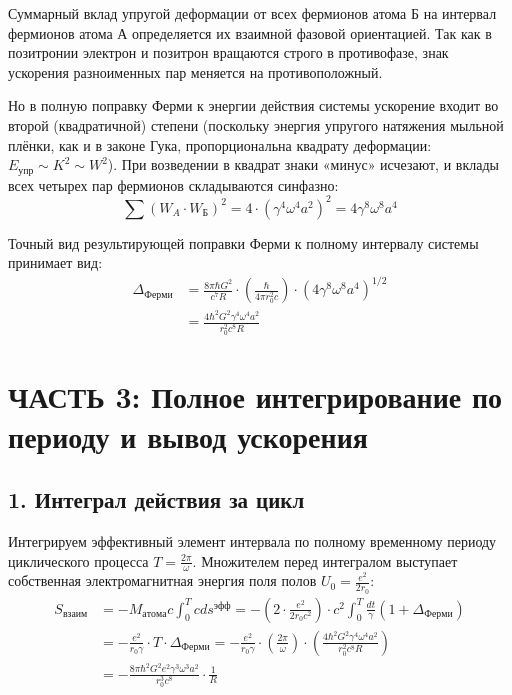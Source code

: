 \documentclass[12pt,a4paper]{article}
\begin{document}
Суммарный вклад упругой деформации от всех фермионов атома Б на интервал фермионов атома А определяется их взаимной фазовой ориентацией. Так как в позитронии электрон и позитрон вращаются строго в противофазе, знак ускорения разноименных пар меняется на противоположный.

Но в полную поправку Ферми к энергии действия системы ускорение входит во второй (квадратичной) степени (поскольку энергия упругого натяжения мыльной плёнки, как и в законе Гука, пропорциональна квадрату деформации: $E_{упр} \sim K^2 \sim W^2$). При возведении в квадрат знаки «минус» исчезают, и вклады всех четырех пар фермионов складываются синфазно:
\begin{equation}
\sum (W_{A} \cdot W_{Б})^2 = 4 \cdot \left( \gamma^4 \omega^4 a^2 \right)^2 = 4 \gamma^8 \omega^8 a^4
\end{equation}

Точный вид результирующей поправки Ферми к полному интервалу системы принимает вид:
\begin{align}
\Delta_{Ферми} &= \frac{8\pi \hbar G^2}{c^7 R} \cdot \left( \frac{\hbar}{4\pi r_0^2 c} \right) \cdot \left( 4 \gamma^8 \omega^8 a^4 \right)^{1/2} \\
&= \frac{4 \hbar^2 G^2 \gamma^4 \omega^4 a^2}{r_0^2 c^8 R}
\end{align}

\section*{ЧАСТЬ 3: Полное интегрирование по периоду и вывод ускорения}

\subsection*{1. Интеграл действия за цикл}

Интегрируем эффективный элемент интервала по полному временному периоду циклического процесса $T = \frac{2\pi}{\omega}$. Множителем перед интегралом выступает собственная электромагнитная энергия поля полов $U_0 = \frac{e^2}{2r_0}$:
\begin{align}
S_{взаим} &= - M_{атома} c \int_0^T c ds^{эфф} = - \left( 2 \cdot \frac{e^2}{2r_0 c^2} \right) \cdot c^2 \int_0^T \frac{dt}{\gamma} (1 + \Delta_{Ферми}) \\
&= - \frac{e^2}{r_0 \gamma} \cdot T \cdot \Delta_{Ферми} = - \frac{e^2}{r_0 \gamma} \cdot \left( \frac{2\pi}{\omega} \right) \cdot \left( \frac{4 \hbar^2 G^2 \gamma^4 \omega^4 a^2}{r_0^2 c^8 R} \right) \\
&= - \frac{8\pi \hbar^2 G^2 e^2 \gamma^3 \omega^3 a^2}{r_0^3 c^8} \cdot \frac{1}{R}
\end{align}
\end{document}
